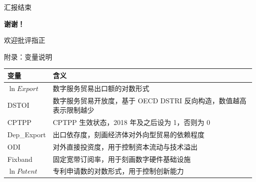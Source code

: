 \documentclass[aspectratio=169,10pt]{ctexbeamer}
\begin{document}
\begin{frame}{汇报结束}
  \begin{center}
    \vspace{1.2cm}
    {\Huge\color{XJTUBlue}\bfseries 谢谢！}
    \vspace{0.8cm}

    {\large 欢迎批评指正}
  \end{center}
\end{frame}

\appendix

\begin{frame}{附录：变量说明}
  \begin{table}
  \centering
  \small
  \begin{tabularx}{\linewidth}{lX}
    \toprule
    变量 & 含义 \\
    \midrule
    $\ln Export$ & 数字服务贸易出口额的对数形式 \\
    DSTOI & 数字服务贸易开放度，基于 OECD DSTRI 反向构造，数值越高表示限制越少 \\
    CPTPP & CPTPP 生效状态，2018 年及之后设为 1，否则为 0 \\
    Dep\_Export & 出口依存度，刻画经济体对外向型贸易的依赖程度 \\
    ODI & 对外直接投资度，用于控制资本流动与技术溢出 \\
    Fixband & 固定宽带订阅率，用于刻画数字硬件基础设施 \\
    $\ln Patent$ & 专利申请数的对数形式，用于控制创新能力 \\
    \bottomrule
  \end{tabularx}
  \end{table}
\end{frame}
\end{document}
